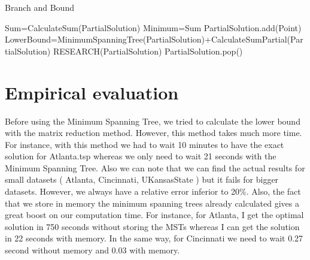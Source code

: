 \documentclass[12pt]{article}
\begin{document}
\begin{algorithm}
  \caption{Branch and Bound}\label{euclid}
  \begin{algorithmic}[1]
	\State Sum=CalculateSum(PartialSolution)
	      \State Minimum=Sum
	\EndIf
      \EndIf
	      \State PartialSolution.add(Point)
	      \State LowerBound=MinimumSpanningTree(PartialSolution)+CalculateSumPartial(PartialSolution)
		\State RESEARCH(PartialSolution)
	      \EndIf
	       \State PartialSolution.pop()
	\EndIf
      \EndFor
    \EndFunction
  \end{algorithmic}
\end{algorithm}

\section{Empirical evaluation}

Before using the Minimum Spanning Tree, we tried to calculate the lower bound with the matrix reduction method. However, this method takes much more time. For instance, with this method we had to wait 10 minutes to have the exact solution for Atlanta.tsp whereas we only need to wait 21 seconds with the Minimum Spanning Tree. Also we can note that we can find the actual results for small datasets ( Atlanta, Cincinnati, UKansasState ) but it fails for bigger datasets. However, we always have a relative error inferior to 20\%. Also, the fact that we store in memory the minimum spanning trees already calculated gives a great boost on our computation time. For instance, for Atlanta, I get the optimal solution in 750 seconds without storing the MSTs whereas I can get the solution in 22 seconds with memory. In the same way, for Cincinnati we need to wait 0.27 second without memory and 0.03 with memory. \\
\end{document}
